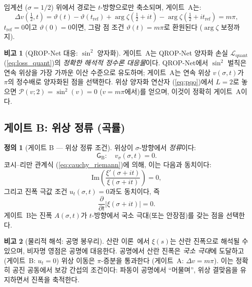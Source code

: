 \documentclass[11pt, a4paper]{article}
\theoremstyle{definition}
\newtheorem{definition}{정의}[section]
\newtheorem{remark}{비고}[section]
\theoremstyle{plain}
\newcommand{\xif}{\xi}
\newcommand{\Ampl}{A}
\newcommand{\GateB}{\mathsf{G}_{\mathrm{B}}}
\begin{document}
임계선 ($\sigma = 1/2$) 위에서 경로는 $t$-방향으로만 축소되며, 게이트~A는:
\begin{equation}
  \Delta v(\tfrac{1}{2}, t) =
  \vartheta(t) - \vartheta(t_{\mathrm{ref}}) +
  \arg\zeta(\tfrac{1}{2}+it) - \arg\zeta(\tfrac{1}{2}+it_{\mathrm{ref}})
  = m\pi,
  \label{eq:gate_a_critical}
\end{equation}
$t_{\mathrm{ref}} = 0$이고 $\vartheta(0) = 0$이면, 그람 점 조건 $\vartheta(t) = m\pi$로 환원된다 ($\arg\zeta$ 보정까지).

\begin{remark}[QROP-Net 대응: $\sin^2$ 양자화]
\label{rem:gate_a_parallel}
게이트~A는 QROP-Net 양자화 손실 $\mathcal{L}_{\mathrm{quant}}$ (\cref{eq:loss_quant})의 \textit{정확한 해석적 정수론 대응물}이다. QROP-Net에서 $\sin^2$ 벌칙은 연속 위상을 가장 가까운 이산 수준으로 유도하며; 게이트~A는 연속 위상 $v(\sigma,t)$가 $\pi$의 정수배로 양자화된 점을 선택한다. 위상 양자화 연산자 (\cref{eq:pqo})에서 $L=2$로 놓으면 $\mathcal{P}(v; 2) = \sin^2(v) = 0$ ($v = m\pi$에서)를 얻으며, 이것이 정확히 게이트~A이다.
\end{remark}


\subsection{게이트 B: 위상 정류 (곡률)}

\begin{definition}[게이트 B --- 위상 정류 조건]
\label{def:gate_b}
위상이 $\sigma$-방향에서 \textit{정류}이다:
\begin{equation}
\boxed{
  \GateB: \quad v_\sigma(\sigma, t) = 0.
}
\label{eq:gate_b}
\end{equation}
코시--리만 관계식 (\cref{eq:cauchy_riemann})에 의해, 이는 다음과 동치이다:
\begin{equation}
  \mathrm{Im}\!\left(\frac{\xif'(\sigma+it)}{\xif(\sigma+it)}\right) = 0,
  \label{eq:gate_b_cr}
\end{equation}
그리고 진폭 극값 조건 $u_t(\sigma,t) = 0$과도 동치이다, 즉
\begin{equation}
  \frac{\partial}{\partial t}|\xif(\sigma + it)| = 0.
  \label{eq:amplitude_extremum}
\end{equation}
게이트~B는 진폭 $\Ampl(\sigma,t)$가 $t$-방향에서 국소 극대(또는 안장점)를 갖는 점을 선택한다.
\end{definition}

\begin{remark}[물리적 해석: 공명 봉우리]
\label{rem:resonance_peak}
산란 이론~\cite{khare1997}에서 $\xif(s)$는 산란 진폭으로 해석될 수 있으며, 비자명 영점은 공명에 대응한다. 공명에서 산란 진폭은 \textit{국소 극대}에 도달하고 (게이트~B: $u_t = 0$) 위상 이동은 $\pi$-증분을 통과한다 (게이트~A: $\Delta v = m\pi$). 이는 정확히 공진 공동에서 보강 간섭의 조건이다: 파동이 공명에서 ``머물며'', 위상 결맞음을 유지하면서 진폭을 축적한다.
\end{remark}
\end{document}
